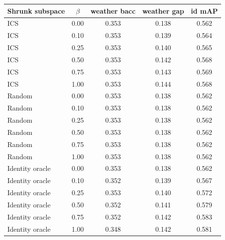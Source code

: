 \begin{tabular}{lcccc}
\toprule
Shrunk subspace & $\beta$ & weather bacc & weather gap & id mAP \\
\midrule
ICS & 0.00 & 0.353 & 0.138 & 0.562 \\
ICS & 0.10 & 0.353 & 0.139 & 0.564 \\
ICS & 0.25 & 0.353 & 0.140 & 0.565 \\
ICS & 0.50 & 0.353 & 0.142 & 0.568 \\
ICS & 0.75 & 0.353 & 0.143 & 0.569 \\
ICS & 1.00 & 0.353 & 0.144 & 0.568 \\
Random & 0.00 & 0.353 & 0.138 & 0.562 \\
Random & 0.10 & 0.353 & 0.138 & 0.562 \\
Random & 0.25 & 0.353 & 0.138 & 0.562 \\
Random & 0.50 & 0.353 & 0.138 & 0.562 \\
Random & 0.75 & 0.353 & 0.138 & 0.562 \\
Random & 1.00 & 0.353 & 0.138 & 0.562 \\
Identity oracle & 0.00 & 0.353 & 0.138 & 0.562 \\
Identity oracle & 0.10 & 0.352 & 0.139 & 0.567 \\
Identity oracle & 0.25 & 0.353 & 0.140 & 0.572 \\
Identity oracle & 0.50 & 0.352 & 0.141 & 0.579 \\
Identity oracle & 0.75 & 0.352 & 0.142 & 0.583 \\
Identity oracle & 1.00 & 0.348 & 0.142 & 0.581 \\
\bottomrule
\end{tabular}
